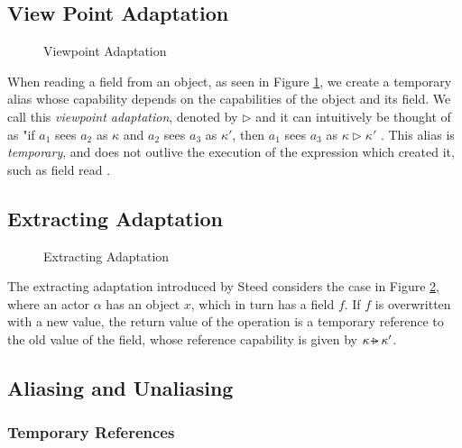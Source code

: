 \subsection{View Point Adaptation}

\begin{figure}[h]
    \centering
    
    \caption{Viewpoint Adaptation}
    \label{fig:viewpoint}
\end{figure}

When reading a field from an object, as seen in Figure \ref{fig:viewpoint}, we create a temporary alias whose capability depends on the capabilities of the object and its field. We call this \textit{viewpoint adaptation}, denoted by $\triangleright$ and it can intuitively be thought of as "if \textit{$a_1$} sees \textit{$a_2$} as $\kappa$ and \textit{$a_2$} sees \textit{$a_3$} as $\kappa'$, then \textit{$a_1$} sees \textit{$a_3$} as  $\kappa \triangleright \kappa'$ \cite{Cunningham2008}. This alias is \textit{temporary}, and does not outlive the execution of the expression which created it, such as field read \cite{Clebsch2015}.

\subsection{Extracting Adaptation} \label{extracting}

\begin{figure}[h]
    \centering
    
    \caption{Extracting Adaptation}
    \label{fig:extracting}
\end{figure}

The extracting adaptation introduced by Steed \cite{Steed2016} considers the case in Figure \ref{fig:extracting}, where an actor $\alpha$ has an object $x$, which in turn has a field $f$. If $f$ is overwritten with a new value, the return value of the operation is a temporary reference to the old value of the field, whose reference capability is given by $\kappa \extract \kappa'$.

\subsection{Aliasing and Unaliasing}

\subsubsection{Temporary References} \label{sec:bg-temp}

